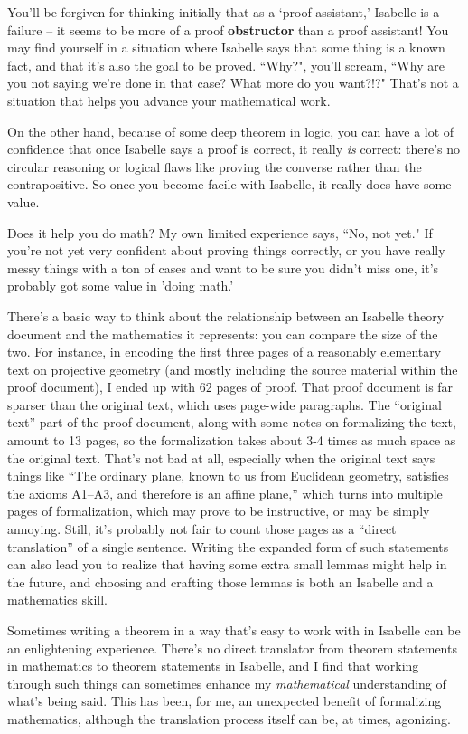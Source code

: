 You'll be forgiven for thinking initially that as a `proof assistant,' Isabelle is a failure -- it seems to be more of a proof \textbf{obstructor} than a proof assistant! You may find yourself in a situation where Isabelle says that some thing is a known fact, and that it's also the goal to be proved. ``Why?", you'll scream, ``Why are you not saying we're done in that case? What more do you want?!?" That's not a situation that helps you advance your mathematical work.  

On the other hand, because of some deep theorem in logic, you can have a lot of confidence that once Isabelle says a proof is correct, it really \textit{is} correct: there's no circular reasoning or logical flaws like proving the converse rather than the contrapositive. So once you become facile with Isabelle, it really does have some value. 

Does it help you do math? My own limited experience says, ``No, not yet." If you're not yet very confident about proving things correctly, or you have really messy things with a ton of cases and want to be sure you didn't miss one, it's probably got some value in 'doing math.' 

There's a basic way to think about the relationship between an Isabelle theory document and the mathematics it represents: you can compare the size of the two. For instance, in encoding the first three pages of a reasonably elementary text on projective geometry (and mostly including the source material within the proof document), I ended up with 62 pages of proof. That proof document is far sparser than the original text, which uses page-wide paragraphs. The ``original text'' part of the proof document, along with some notes on formalizing the text, amount to 13 pages, so the formalization takes about 3-4 times as much space as the original text. That's not bad at all, especially when the original text says things like ``The ordinary plane, known to us from Euclidean geometry, satisfies the axioms A1–A3, and therefore is an affine plane,'' which turns into multiple pages of formalization, which may prove to be instructive, or may be simply annoying. Still, it's probably not fair to count those pages as a ``direct translation'' of a single sentence. Writing the expanded form of such statements can also lead you to realize that having some extra small lemmas might help in the future, and choosing and crafting those lemmas is both an Isabelle and a mathematics skill. 

Sometimes writing a theorem in a way that's easy to work with in Isabelle can be an enlightening experience. There's no direct translator from theorem statements in mathematics to theorem statements in Isabelle, and I find that working through such things can sometimes enhance my \emph{mathematical} understanding of what's being said. This has been, for me, an unexpected benefit of formalizing mathematics, although the translation process itself can be, at times, agonizing. 


